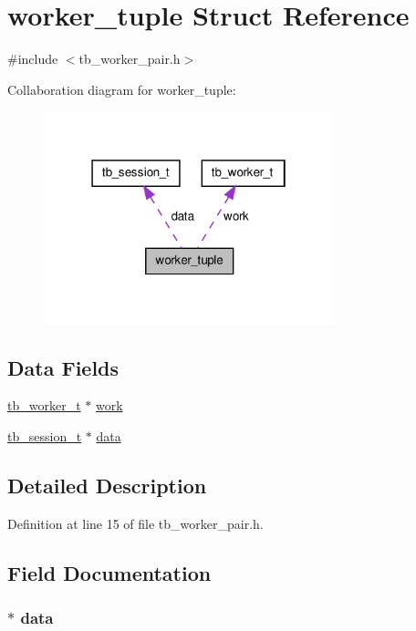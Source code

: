 \hypertarget{structworker__tuple}{\section{worker\-\_\-tuple Struct Reference}
\label{structworker__tuple}
}


{\ttfamily \#include $<$tb\-\_\-worker\-\_\-pair.\-h$>$}



Collaboration diagram for worker\-\_\-tuple\-:\nopagebreak
\begin{figure}[H]
\begin{center}
\leavevmode
\includegraphics[width=238pt]{structworker__tuple__coll__graph}
\end{center}
\end{figure}
\subsection*{Data Fields}
\begin{DoxyCompactItemize}
\item 
\hyperlink{structtb__worker__t}{tb\-\_\-worker\-\_\-t} $\ast$ \hyperlink{structworker__tuple_a251992dcf5d5af0421eb260017a00b2a}{work}
\item 
\hyperlink{structtb__session__t}{tb\-\_\-session\-\_\-t} $\ast$ \hyperlink{structworker__tuple_a1c1dc2e9642e013fcac80a215230478a}{data}
\end{DoxyCompactItemize}


\subsection{Detailed Description}


Definition at line 15 of file tb\-\_\-worker\-\_\-pair.\-h.



\subsection{Field Documentation}
\hypertarget{structworker__tuple_a1c1dc2e9642e013fcac80a215230478a}{
\subsubsection[{data}]{$\ast$ data}}\label{structworker__tuple_a1c1dc2e9642e013fcac80a215230478a}


